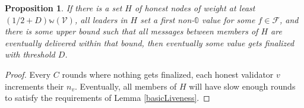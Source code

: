 \documentclass[12pt]{article}
\newtheorem{proposition}{Proposition}
\begin{document}
\begin{proposition}
  If there is a set $H$ of honest nodes of weight at least $(1/2 + D) \mathbb{w}(\mathcal{V})$, all leaders in $H$ set a first non-$\mathbb{0}$ value for some $f \in \mathcal{F}$, and there is some upper bound such that all messages between members of $H$ are eventually delivered within that bound, then eventually some value gets finalized with threshold $D$.
\end{proposition}

\begin{proof}
  Every $C$ rounds where nothing gets finalized, each honest validator $v$ increments their $n_v$. Eventually, all members of $H$ will have slow enough rounds to satisfy the requirements of Lemma \ref{basicLiveness}.
\end{proof}
\end{document}
